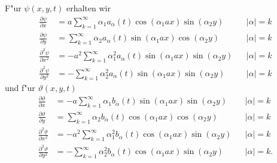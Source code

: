 \begin{refsection}
F"ur $\psi(x,y,t)$ erhalten wir
\begin{align*}
\frac{\partial\psi}{\partial x}
&=
a
\sum_{k = 1}^{\infty}
\alpha_1
a_{\alpha}(t)
\cos(\alpha_1 ax) \sin(\alpha_2 y)
&&|\alpha| = k
\\
\frac{\partial\psi}{\partial y}
&=
\sum_{k = 1}^{\infty}
\alpha_2
a_{\alpha}(t)
\sin(\alpha_1 ax) \cos(\alpha_2 y)
&&|\alpha| = k
\\
\frac{\partial^2\psi}{\partial x^2}
&=
-
a^2
\sum_{k = 1}^{\infty}
\alpha_1^2
a_{\alpha}(t)
\sin(\alpha_1 ax) \sin(\alpha_2 y)
&&|\alpha| = k
\\
\frac{\partial^2\psi}{\partial y^2}
&=
-
\sum_{k = 1}^{\infty}
\alpha_2^2
a_{\alpha}(t)
\sin(\alpha_1 ax) \sin(\alpha_2 y)
&&|\alpha| = k
\end{align*}
und f"ur $\vartheta(x,y,t)$
\begin{align*}
\frac{\partial\vartheta}{\partial x}
&=
-
a
\sum_{k = 1}^{\infty}
\alpha_1
b_{\alpha}(t)
\sin(\alpha_1 ax) \sin(\alpha_2 y)
&&|\alpha| = k
\\
\frac{\partial\vartheta}{\partial y}
&=
\sum_{k = 1}^{\infty}
\alpha_2
b_{\alpha}(t)
\cos(\alpha_1 ax) \cos(\alpha_2 y)
&&|\alpha| = k
\\
\frac{\partial^2\vartheta}{\partial x^2}
&=
-
a^2
\sum_{k = 1}^{\infty}
\alpha_1^2
b_{\alpha}(t)
\cos(\alpha_1 ax) \sin(\alpha_2 y)
&&|\alpha| = k
\\
\frac{\partial^2\vartheta}{\partial y^2}
&=
-
\sum_{k = 1}^{\infty}
\alpha_2^2
b_{\alpha}(t)
\cos(\alpha_1 ax) \sin(\alpha_2 y)
&&|\alpha| = k.
\end{align*}


\end{refsection}
